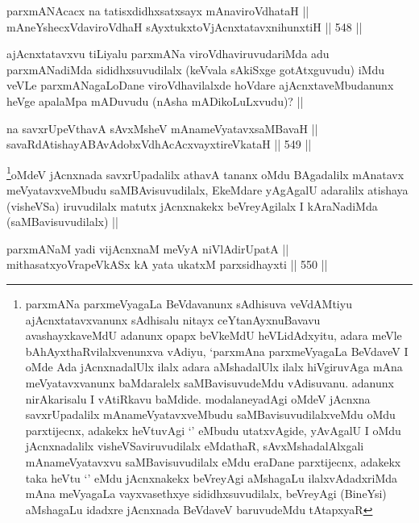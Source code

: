 
\begin{shl}
parxmANAcacx na tatisxdidhxsatxsayx mAnaviroVdhataH || \\
mAneYshecxVdaviroVdhaH sAyxtukxtoV\s jAcnxtatavxnihunxtiH ||  548 ||  
\end{shl}

\begin{artha}
ajAcnxtatavxvu tiLiyalu parxmANa viroVdhaviruvudariMda adu parxmANadiMda sididhxsuvudilalx (keVvala sAkiSxge gotAtxguvudu) iMdu veVLe parxmANagaLoDane viroVdhavilalxde hoVdare ajAcnxtaveMbudanunx heVge apalaMpa mADuvudu (nAsha mADikoLuLxvudu)? ||
\end{artha}

\begin{shl}
na savxrUpeV\s thavA sAvxMsheV mAnameVyatavxsaMBavaH || \\
savaRdA\s tishayABAvAdobxVdhAcAcxvayxtireVkataH ||  549 ||  
\end{shl}

\begin{artha}
\footnote{parxmANa parxmeVyagaLa BeVdavanunx sAdhisuva veVdAMtiyu ajAcnxtatavxvanunx sAdhisalu nitayx ceYtanAyxnuBavavu avashayxkaveMdU adanunx opapx beVkeMdU heVLidAdxyitu, adara meVle bAhAyxthaRvilalxvenunxva vAdiyu, `parxmAna parxmeVyagaLa BeVdaveV I oMde Ada jAcnxnadalUlx ilalx adara aMshadalUlx ilalx hiVgiruvAga mAna meVyatavxvanunx baMdaralelx saMBavisuvudeMdu vAdisuvanu. adanunx nirAkarisalu I vAtiRkavu baMdide. modalaneyadAgi oMdeV jAcnxna savxrUpadalilx mAnameVyatavxveMbudu saMBavisuvudilalxveMdu oMdu parxtijecnx, adakekx heVtuvAgi `\stext' eMbudu utatxvAgide, yAvAgalU I oMdu jAcnxnadalilx visheVSaviruvudilalx eMdathaR, sAvxMshadalAlxgali mAnameVyatavxvu saMBavisuvudilalx eMdu eraDane parxtijecnx, adakekx taka heVtu `\stext' eMdu jAcnxnakekx beVreyAgi aMshagaLu ilalxvAdadxriMda mAna meVyagaLa vayxvasethxye sididhxsuvudilalx, beVreyAgi (BineYsi) aMshagaLu idadxre jAcnxnada BeVdaveV baruvudeMdu tAtapxyaR}oMdeV jAcnxnada savxrUpadalilx athavA tananx oMdu BAgadalilx mAnatavx meVyatavxveMbudu saMBAvisuvudilalx, EkeMdare yAgAgalU adaralilx atishaya (visheVSa) iruvudilalx matutx jAcnxnakekx beVreyAgilalx I kAraNadiMda (saMBavisuvudilalx) ||
\end{artha}


\begin{shl}
parxmANaM yadi vijAcnxnaM meVyA niVlAdirUpatA || \\
mithasatxyoVrapeVkASx kA yata ukatxM parxsidhayxti ||  550 ||  
\end{shl}

